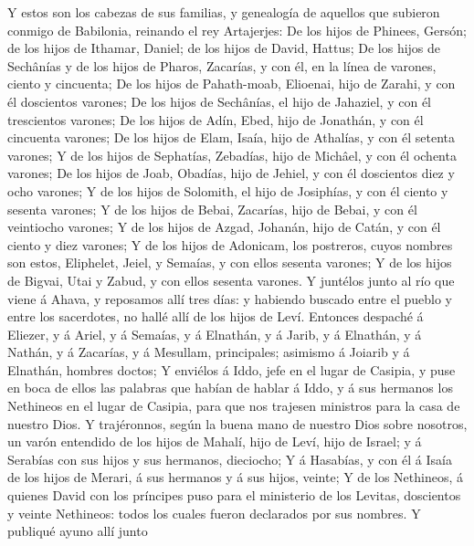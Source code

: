  Y estos son los cabezas de sus familias, y genealogía de
aquellos que subieron conmigo de Babilonia, reinando el rey Artajerjes:
 De los hijos de Phinees, Gersón; de los hijos de Ithamar,
Daniel; de los hijos de David, Hattus;  De los hijos de
Sechânías y de los hijos de Pharos, Zacarías, y con él, en la línea de
varones, ciento y cincuenta;  De los hijos de Pahath-moab,
Elioenai, hijo de Zarahi, y con él doscientos varones;  De
los hijos de Sechânías, el hijo de Jahaziel, y con él trescientos
varones;  De los hijos de Adín, Ebed, hijo de Jonathán, y
con él cincuenta varones;  De los hijos de Elam, Isaía,
hijo de Athalías, y con él setenta varones;  Y de los
hijos de Sephatías, Zebadías, hijo de Michâel, y con él ochenta varones;
 De los hijos de Joab, Obadías, hijo de Jehiel, y con él
doscientos diez y ocho varones;  Y de los hijos de
Solomith, el hijo de Josiphías, y con él ciento y sesenta varones;
 Y de los hijos de Bebai, Zacarías, hijo de Bebai, y con
él veintiocho varones;  Y de los hijos de Azgad, Johanán,
hijo de Catán, y con él ciento y diez varones;  Y de los
hijos de Adonicam, los postreros, cuyos nombres son estos, Eliphelet,
Jeiel, y Semaías, y con ellos sesenta varones;  Y de los
hijos de Bigvai, Utai y Zabud, y con ellos sesenta varones.
 Y juntélos junto al río que viene á Ahava, y reposamos
allí tres días: y habiendo buscado entre el pueblo y entre los
sacerdotes, no hallé allí de los hijos de Leví.  Entonces
despaché á Eliezer, y á Ariel, y á Semaías, y á Elnathán, y á Jarib, y á
Elnathán, y á Nathán, y á Zacarías, y á Mesullam, principales; asimismo
á Joiarib y á Elnathán, hombres doctos;  Y enviélos á
Iddo, jefe en el lugar de Casipia, y puse en boca de ellos las palabras
que habían de hablar á Iddo, y á sus hermanos los Nethineos en el lugar
de Casipia, para que nos trajesen ministros para la casa de nuestro
Dios.  Y trajéronnos, según la buena mano de nuestro Dios
sobre nosotros, un varón entendido de los hijos de Mahalí, hijo de Leví,
hijo de Israel; y á Serabías con sus hijos y sus hermanos, dieciocho;
 Y á Hasabías, y con él á Isaía de los hijos de Merari, á
sus hermanos y á sus hijos, veinte;  Y de los Nethineos,
á quienes David con los príncipes puso para el ministerio de los
Levitas, doscientos y veinte Nethineos: todos los cuales fueron
declarados por sus nombres.  Y publiqué ayuno allí junto

